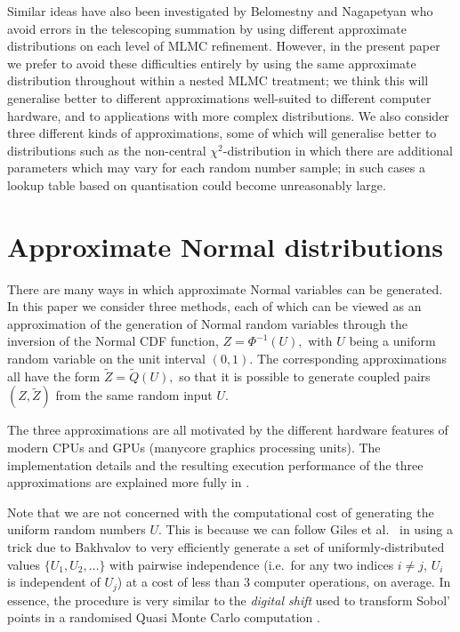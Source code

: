 \documentclass[11pt]{article}
\def \tQ {{\widetilde{Q}}}
\def \tZ {{\widetilde{Z}}}
\begin{document}
Similar ideas have also been investigated by Belomestny and Nagapetyan \cite{bn17}
who avoid errors in the telescoping summation by using different approximate
distributions on each level of MLMC refinement.  However, in the present paper
we prefer to avoid these difficulties entirely by using the same approximate
distribution throughout within a nested MLMC treatment; we think this will
generalise better to different approximations well-suited to different
computer hardware, and to applications with more complex distributions.
We also consider three different kinds of approximations, some of which
will generalise better to distributions such as the non-central
$\chi^2$-distribution in which there are additional parameters which may
vary for each random number sample; in such cases a lookup table based
on quantisation could become unreasonably large. 

\section{Approximate Normal distributions}

\label{sec:approximations}

There are many ways in which approximate Normal variables can be generated.
In this paper we consider three methods, each of which can be viewed as an
approximation of the generation of Normal random variables
through the inversion of the Normal CDF function,
$\displaystyle
Z = \Phi^{-1}(U),
$
with $U$ being a uniform random variable on the unit interval $(0,1)$.
The corresponding approximations all have the form
$\displaystyle
\tZ = \tQ(U),
$
so that it is possible to generate coupled pairs $(Z,\tZ)$ 
from the same random input $U$.

The three approximations are all motivated by the different hardware features 
of modern CPUs and GPUs (manycore graphics processing units). The 
implementation details and the resulting execution performance of 
the three approximations are explained more fully in \cite{sheridan-methven20}.

Note that we are not concerned with the computational cost of generating the 
uniform random numbers $U$.  This is because we can follow 
Giles et al.~\cite{ghmr19b} in using a trick due to 
Bakhvalov \cite{bakhvalov64} to very efficiently 
generate a set of uniformly-distributed values $\{ U_1, U_2, \ldots\}$ 
with pairwise independence (i.e.~for any two indices $i\neq j$, $U_i$ 
is independent of $U_j$) at a cost of less than 3 computer operations, 
on average.
In essence, the procedure is very similar to the \emph{digital shift} 
used to transform Sobol' points in a randomised Quasi Monte Carlo 
computation \cite{ecuyer18}.
\end{document}

